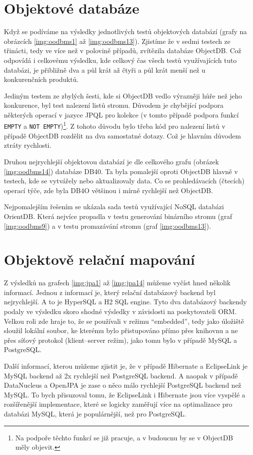 \section{Objektové databáze}
Když se podíváme na výsledky jednotlivých testů objektových databází (grafy na obrázcích \ref{img:oodbms1} až \ref{img:oodbms13}). Zjistíme že v sedmi testech ze třinácti, tedy ve více než v polovině případů, zvítězila databáze ObjectDB. Což odpovídá i celkovému výsledku, kde celkový čas všech testů využívajících tuto databázi, je přibližně dva a půl krát až čtyři a půl krát menší než u konkurenčních produktů.

Jediným testem ze zbylých šesti, kde si ObjectDB vedlo výrazněji hůře než jeho konkurence, byl test nalezení listů stromu. Důvodem je chybějící podpora některých operací v jazyce JPQL pro kolekce (v tomto případě podpora funkcí \texttt{EMPTY} a \texttt{NOT EMPTY})\footnote{Na podpoře těchto funkcí se již pracuje, a v budoucnu by se v ObjectDB měly objevit.}. Z tohoto důvodu bylo třeba kód pro nalezení listů v případě ObjectDB rozdělit na dva samostatné dotazy. Což je hlavním důvodem ztráty rychlosti.

Druhou nejrychlejší objektovou databází je dle celkového grafu (obrázek \ref{img:oodbms14}) databáze DB40. Ta byla pomalejší oproti ObjectDB hlavně v testech, kde se vytvářely nebo aktualizovaly data. Co se prohledávacích (čtecích) operací týče, zde byla DB4O většinou i mírně rychlejší než ObjectDB.

Nejpomalejším řešením se ukázala sada testů využívající NoSQL databázi OrientDB. Která nejvíce propadla v testu generování binárního stromu (graf \ref{img:oodbms9}) a v testu promazávání stromu (graf \ref{img:oodbms13}).


\section{Objektově relační mapování}
Z výsledků na grafech \ref{img:jpa1} až \ref{img:jpa14} můžeme vyčíst hned několik informací. Jednou z informací je, který relační databázový backend byl nejrychlejší. A to je HyperSQL a H2 SQL engine. Tyto dva databázový backendy podaly ve výsledku skoro shodné výsledky v závislosti na poskytovateli ORM. Velkou roli zde hraje to, že se používali v režimu "`embedded"', tedy jako úložiště sloužil lokální soubor, ke kterému bylo přistupováno přímo přes knihovnu a ne přes síťový protokol (klient--server režim), jako tomu bylo v případě MySQL a PostgreSQL.

Další informací, kterou můžeme zjistit je, že v případě Hibernate a EclipseLink je MySQL backend až 2x rychlejší než PostgreSQL backend. A naopak v případě DataNucleus a OpenJPA je zase o něco málo rychlejší PostgreSQL backend než MySQL. To bych přisuzoval tomu, že EclipseLink i Hibernate jsou více vyspělé a rozšířenější implementace, které se logicky zaměřují více na optimalizace pro databázi MySQL, která je populárnější, než pro PostgreSQL.

